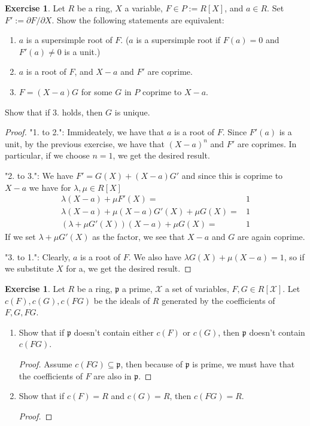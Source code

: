 \documentclass{book}
\theoremstyle{plain}
\theoremstyle{definition}
\newtheorem{exr}[thm]{Exercise}
\theoremstyle{custom_definition}
\begin{document}
\begin{exr}
  Let \(R\) be a ring, \(X\) a variable, \(F \in P := R[X]\), and \(a \in R\). Set \(F' := \partial F / \partial X\). Show the following statements are equivalent:
  \begin{enumerate}
    \item \(a\) is a supersimple root of \(F\). (\(a\) is a supersimple root if \(F(a) = 0\) and \(F'(a) \neq 0\) is a unit.)
    \item \(a\) is a root of \(F\), and \(X - a\) and \(F'\) are coprime.
    \item \(F = (X - a)G\) for some \(G\) in \(P\) coprime to \(X - a\).
  \end{enumerate}
  Show that if 3. holds, then \(G\) is unique.
\end{exr}

\begin{proof}
  "1. to 2.": Immideately, we have that \(a\) is a root of \(F\). Since \(F'(a)\) is a unit, by the previous exercise, we have that \((X - a)^n\) and \(F'\) are coprimes. In particular, if we choose \(n = 1\), we get the desired result.

  "2. to 3.": We have \(F'= G(X) + (X - a)G'\) and since this is coprime to \(X - a\) we have for \(\lambda, \mu \in R[X]\)
  \begin{align}
    \lambda (X - a) + \mu F'(X) =& 1 \\
    \lambda (X - a) + \mu (X - a)G'(X) + \mu G(X) =& 1 \\
    (\lambda + \mu G'(X) ) (X - a) + \mu G(X) =& 1
  \end{align}
  If we set \(\lambda + \mu G'(X)\) as the factor, we see that \(X - a\) and \(G\) are again coprime.

  "3. to 1.": Clearly, \(a\) is a root of \(F\). We also have \(\lambda G(X) + \mu (X - a) = 1\), so if we substitute \(X\) for a, we get the desired result.
\end{proof}

\begin{exr}
  Let \(R\) be a ring, \(\mathfrak{p}\) a prime, \(\mathcal{X}\) a set of variables, \(F, G \in R[\mathcal{X}]\). Let \(c(F), c(G), c(FG)\) be the ideals of \(R\) generated by the coefficients of \(F, G, FG\).
  \begin{enumerate}
    \item Show that if \(\mathfrak{p}\) doesn't contain either \(c(F)\) or \(c(G)\), then \(\mathfrak{p}\) doesn't contain \(c(FG)\).
    \begin{proof}
      Assume \(c(FG) \subseteq \mathfrak{p}\), then because of \(\mathfrak{p}\) is prime, we must have that the coefficients of \(F\) are also in \(\mathfrak{p}\).
    \end{proof}
    \item Show that if \(c(F) = R\) and \(c(G) = R\), then \(c(FG) = R\).
    \begin{proof}
      
    \end{proof}
  \end{enumerate}
\end{exr}
\end{document}
